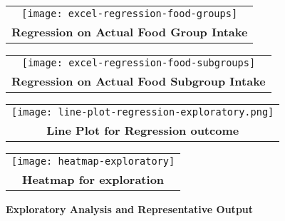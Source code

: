 \begin{figure}
\begin{tabular}{|c|}
\hline
\texttt{[image: excel-regression-food-groups]} \\
\textbf{Regression on Actual Food Group Intake}\\
\hline
\end{tabular}

\begin{tabular}{|c|}
\hline
\texttt{[image: excel-regression-food-subgroups]}\\
\textbf{Regression on Actual Food Subgroup Intake} \\
\hline
\end{tabular}

\begin{tabular}{|c|}
\hline
\texttt{[image: line-plot-regression-exploratory.png]}\\
\textbf{Line Plot for Regression outcome}\\
\hline
\end{tabular}

\begin{tabular}{|c|}
\hline
\texttt{[image: heatmap-exploratory]}\\
\textbf{Heatmap for exploration}\\
\hline
\end{tabular}
\caption{\textbf{Exploratory Analysis and Representative Output}}
\label{exploratory-output}
\end{figure}




